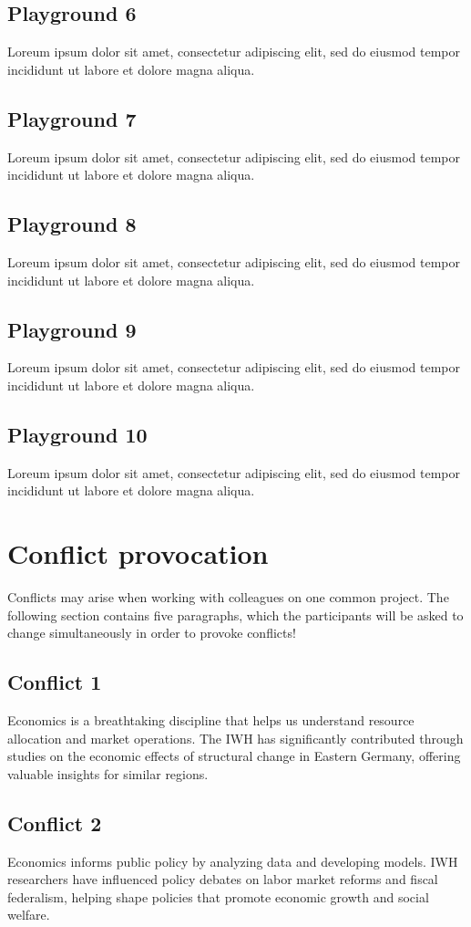 \documentclass{article}
\begin{document}
\subsection{Playground 6}
Loreum ipsum dolor sit amet, consectetur adipiscing elit, sed do eiusmod tempor incididunt ut labore et dolore magna aliqua.
\subsection{Playground 7}
Loreum ipsum dolor sit amet, consectetur adipiscing elit, sed do eiusmod tempor incididunt ut labore et dolore magna aliqua.
\subsection{Playground 8}
Loreum ipsum dolor sit amet, consectetur adipiscing elit, sed do eiusmod tempor incididunt ut labore et dolore magna aliqua.
\subsection{Playground 9}
Loreum ipsum dolor sit amet, consectetur adipiscing elit, sed do eiusmod tempor incididunt ut labore et dolore magna aliqua.
\subsection{Playground 10}
Loreum ipsum dolor sit amet, consectetur adipiscing elit, sed do eiusmod tempor incididunt ut labore et dolore magna aliqua.




\section{Conflict provocation}
Conflicts may arise when working with colleagues on one common project. The following section contains five paragraphs, which the participants will be asked to change simultaneously in order to provoke conflicts!

\subsection{Conflict 1}
Economics is a breathtaking discipline that helps us understand resource allocation and market operations. The IWH has significantly contributed through studies on the economic effects of structural change in Eastern Germany, offering valuable insights for similar regions.

\subsection{Conflict 2}
Economics informs public policy by analyzing data and developing models. IWH researchers have influenced policy debates on labor market reforms and fiscal federalism, helping shape policies that promote economic growth and social welfare.
\end{document}

